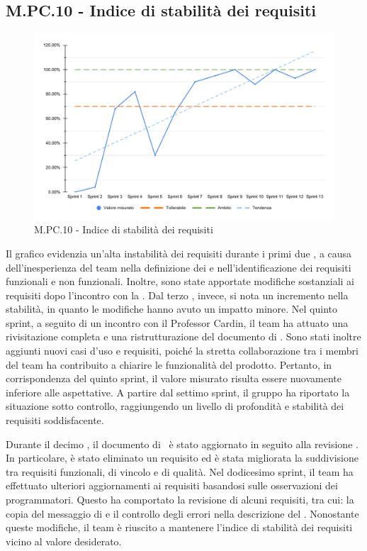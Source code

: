 \subsection{M.PC.10 - Indice di stabilità dei requisiti}
\begin{figure}[H]
    \centering
    \includegraphics[width=\textwidth]{assets/stabilita_requisiti.pdf}
    \caption{M.PC.10 - Indice di stabilità dei requisiti}
\end{figure}

\par Il grafico evidenzia un'alta instabilità dei requisiti durante i primi due , a causa dell'inesperienza del team nella definizione dei  e nell'identificazione dei requisiti funzionali e non funzionali. Inoltre, sono state apportate modifiche sostanziali ai requisiti dopo l'incontro con la . Dal terzo , invece, si nota un incremento nella stabilità, in quanto le modifiche hanno avuto un impatto minore. Nel quinto sprint, a seguito di un incontro con il Professor Cardin, il team ha attuato una rivisitazione completa e una ristrutturazione del documento di \AdR. Sono stati inoltre aggiunti nuovi casi d'uso e requisiti, poiché la stretta collaborazione tra i membri del team ha contribuito a chiarire le funzionalità del prodotto. Pertanto, in corrispondenza del quinto sprint, il valore misurato risulta essere nuovamente inferiore alle aspettative. A partire dal settimo sprint, il gruppo ha riportato la situazione sotto controllo, raggiungendo un livello di profondità e stabilità dei requisiti soddisfacente.

\par Durante il decimo , il documento di \AdR\ è stato aggiornato in seguito alla revisione . In particolare, è stato eliminato un requisito ed è stata migliorata la suddivisione tra requisiti funzionali, di vincolo e di qualità. Nel dodicesimo sprint, il team ha effettuato ulteriori aggiornamenti ai requisiti basandosi sulle osservazioni dei programmatori. Questo ha comportato la revisione di alcuni requisiti, tra cui: la copia del messaggio di  e il controllo degli errori nella descrizione del . Nonostante queste modifiche, il team è riuscito a mantenere l'indice di stabilità dei requisiti vicino al valore desiderato.
